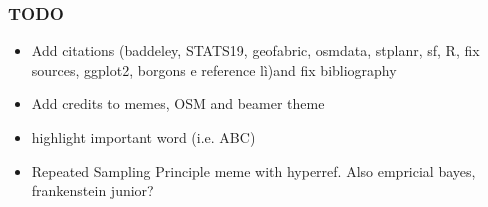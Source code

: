 \documentclass[c,10pt,pdftex]{beamer}
\begin{document}
\begin{frame}
\frametitle{TODO}
\begin{itemize}
	\item Add citations (baddeley, STATS19, geofabric, osmdata, stplanr, sf, R, fix sources, ggplot2, borgons e reference lì)and fix bibliography
	\item Add credits to memes, OSM and beamer theme
	\item highlight important word (i.e. \alert{ABC})
	\item Repeated Sampling Principle meme with hyperref. Also empricial bayes, frankenstein junior? 
\end{itemize}
\end{frame}
\end{document}

